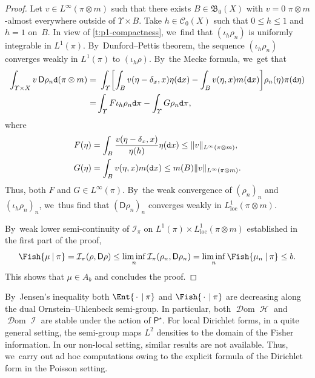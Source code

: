 \documentclass[JEP,XML,SOM,Unicode,published]{cedram}
\theoremstyle{definition}
\theoremstyle{remark}
\DeclarePairedDelimiter{\bracket}{\lbrack}{\rbrack}
\DeclarePairedDelimiter{\norm}{\lVert}{\rVert}
\newcommand{\given}[1][]{%
\nonscript\:#1\vert
\allowbreak
\nonscript\:
\mathopen{}}
\DeclareMathOperator{\ent}{\mathcal{H}}
\DeclareMathOperator{\fish}{\mathcal{I}}
\DeclareMathOperator{\dom}{\mathscr{D}om}
\newcommand{\emparg}{\,\cdot\,}
\begin{document}
\begin{proof}
Let $v \in L^{\infty}(\pi \otimes m)$ such that there exists $B \in \mathfrak{B}_{0}(X)$ with $v = 0$ $\pi \otimes m$-almost everywhere outside of $\varUpsilon \times B$.
Take $h \in \mathscr{C}_{0}(X)$ such that $0 \leq h \leq 1$ and $h = 1$ on~$B$.
In view of \cref{t:p1-compactness}, we~find that $(\iota_{h} \rho_{n})$ is uniformly integrable in $L^{1}(\pi)$.
By~Dunford--Pettis theorem, the sequence $(\iota_{h} \rho_{n})$ converges weakly in $L^{1}(\pi)$ to $(\iota_{h}\rho)$.
By~the Mecke formula, we~get that
\begin{equation*}
\begin{split}
\int_{\varUpsilon \times X} v\, \mathsf{D} \rho_{n} \mathtt{d} (\pi \otimes m) =&\ \int_{\varUpsilon} \bracket*{ \int_{B} v(\eta - \delta_{x}, x) \eta(\mathtt{d} x) - \int_{B} v(\eta, x) m(\mathtt{d} x) } \rho_{n}(\eta) \pi(\mathtt{d} \eta)
\\
=& \int_{\varUpsilon} F \iota_{h} \rho_{n} \mathtt{d} \pi - \int_{\varUpsilon} G \rho_{n} \mathtt{d} \pi,
\end{split}
\end{equation*}
where
\begin{align*}
& F(\eta) = \int_{B} \frac{v(\eta - \delta_{x}, x)}{\eta(h)} \eta(\mathtt{d} x) \leq \norm{v}_{L^{\infty}(\pi \otimes m)}, \\
& G(\eta) = \int_{B} v(\eta, x) m(\mathtt{d} x) \leq m(B) \norm{v}_{L^{\infty}(\pi \otimes m)}.
\end{align*}
Thus, both $F$ and $G \in L^{\infty}(\pi)$.
By~the weak convergence of $(\rho_{n})_n$ and $(\iota_{h} \rho_{n})_n$, we~thus find that $(\mathsf{D} \rho_{n})_n$ converges weakly in $L^{1}_{\mathrm{loc}}(\pi \otimes m)$.

By~weak lower semi-continuity of $\mathcal{I}_{\pi}$ on $L^{1}(\pi) \times L_{\mathrm{loc}}^{1}(\pi \otimes m)$ established in the first part of the proof,
\begin{equation*}
\Fish{\mu \given \pi} = \mathcal{I}_{\pi}(\rho, \mathsf{D} \rho) \leq \liminf_n \mathcal{I}_{\pi}(\rho_{n}, \mathsf{D} \rho_{n}) = \liminf_n \Fish{ \mu_{n} \given \pi } \leq b.
\end{equation*}
This shows that $\mu \in A_b$ and concludes the proof.
\end{proof}

By~Jensen's inequality both $\Ent{\emparg \given \pi}$ and $\Fish{\emparg \given \pi}$ are decreasing along the dual Ornstein--Uhlenbeck semi-group.
In particular, both $\dom \ent$ and $\dom \fish$ are stable under the action of $\mathsf{P}^{\star}$.
For local Dirichlet forms, in a quite general setting, the semi-group maps $L^{2}$ densities to the domain of the Fisher information.
In our non-local setting, similar results are not available.
Thus, we~carry out ad hoc computations owing to the explicit formula of the Dirichlet form in the Poisson setting.
\end{document}
